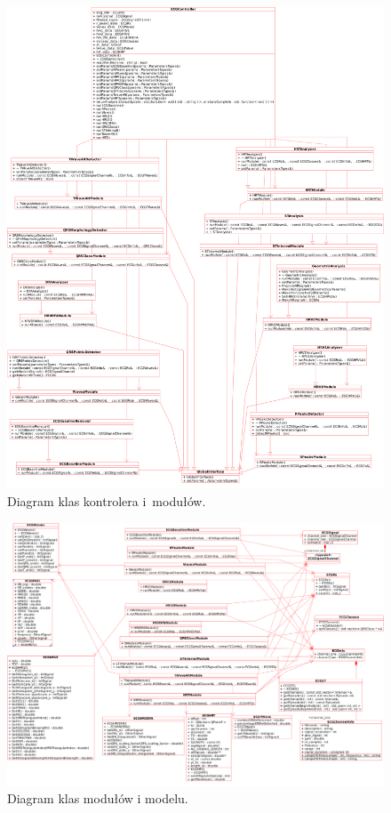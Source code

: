 \documentclass[a4paper, 11pt]{article}
\begin{document}
\begin{figure}[h!]
  \centering
  \includegraphics[width=0.9\linewidth]{include/controller-modules}
  \caption{Diagram klas kontrolera i~modułów.}
  \label{fig:controller-modules}
\end{figure}

\begin{figure}[h!]
  \centering
  \includegraphics[width=0.9\linewidth]{include/modules-model}
  \caption{Diagram klas modułów i modelu.}
  \label{fig:modules-model}
\end{figure}
\end{document}
